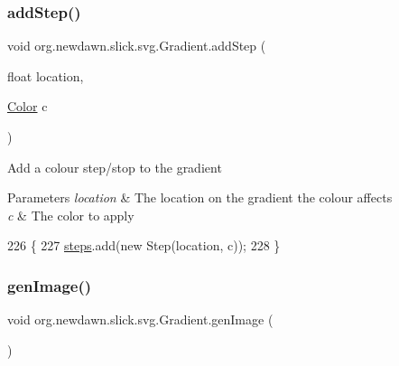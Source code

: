 \subsubsection{\texorpdfstring{add\+Step()}{addStep()}}
{\footnotesize\ttfamily void org.\+newdawn.\+slick.\+svg.\+Gradient.\+add\+Step (\begin{DoxyParamCaption}\item[{float}]{location,  }\item[{\mbox{\hyperlink{classorg_1_1newdawn_1_1slick_1_1_color}{Color}}}]{c }\end{DoxyParamCaption})\hspace{0.3cm}{\ttfamily [inline]}}

Add a colour step/stop to the gradient


\begin{DoxyParams}{Parameters}
{\em location} & The location on the gradient the colour affects \\
\hline
{\em c} & The color to apply \\
\hline
\end{DoxyParams}

\begin{DoxyCode}
226                                                  \{
227         \mbox{\hyperlink{classorg_1_1newdawn_1_1slick_1_1svg_1_1_gradient_a68867778840106c7c126e26065b86bb0}{steps}}.add(\textcolor{keyword}{new} Step(location, c));
228     \}
\end{DoxyCode}
\mbox{\label{classorg_1_1newdawn_1_1slick_1_1svg_1_1_gradient_ac9a99756ee5b6e6badc5a75286102880}} 
\subsubsection{\texorpdfstring{gen\+Image()}{genImage()}}
{\footnotesize\ttfamily void org.\+newdawn.\+slick.\+svg.\+Gradient.\+gen\+Image (\begin{DoxyParamCaption}{ }\end{DoxyParamCaption})\hspace{0.3cm}{\ttfamily [inline]}}

